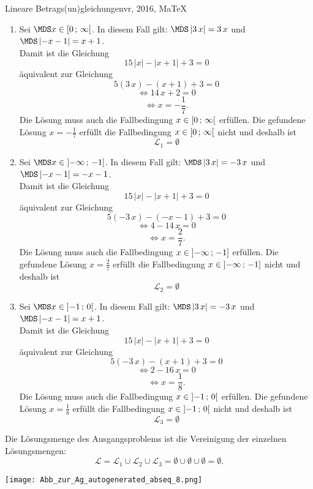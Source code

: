 \begin{MAufgabe}{Lineare Betrags(un)gleichungen}{vr, 2016, MaTeX}
 \begin{enumerate} 
 \item Sei $ \MDS x\in[ 0 \, \MIntvlSep \, \infty\MoIr $. 
 In diesem Fall gilt: 
  $ \MDS \left| 3\, x\right|=3\, x$ und $ \MDS \left|  - x - 1\right|=x + 1$. \\ 
 Damit ist die Gleichung 
 $$ 
15\, \left|x\right| - \left|x + 1\right| + 3= 0
$$
 \"aquivalent zur Gleichung
 $$ 
5\left(3\, x\right)-\left( x + 1\right)+3= 0 
$$  
$$ 
 \Leftrightarrow 14\, x + 2= 0 
$$  
$$ \Leftrightarrow x = - \frac{1}{7} . 
 $$ 
 Die L\"osung muss auch die Fallbedingung $x\in [ 0 \, ; \, \infty[\mbox{}  $ erf\"ullen. Die gefundene L\"osung $x=- \frac{1}{7}$ erf\"ullt die Fallbedingung  $x\in [ 0 \, ; \, \infty[\mbox{} $ nicht und deshalb ist  $$
 \mathcal{L}_{1}=\emptyset 
 $$ 
\item Sei $ \MDS x\in\MoIl  -\infty \, \MIntvlSep \, -1]$. 
 In diesem Fall gilt: 
  $ \MDS \left| 3\, x\right|=- 3\, x$ und $ \MDS \left|  - x - 1\right|= - x - 1$. \\ 
 Damit ist die Gleichung 
 $$ 
15\, \left|x\right| - \left|x + 1\right| + 3= 0
$$
 \"aquivalent zur Gleichung
 $$ 
5\left(- 3\, x\right)-\left(  - x - 1\right)+3= 0 
$$  
$$ 
 \Leftrightarrow 4 - 14\, x= 0 
$$  
$$ \Leftrightarrow x = \frac{2}{7} . 
 $$ 
 Die L\"osung muss auch die Fallbedingung $x\in \mbox{}]\mathopen{}  -\infty \, ; \, -1] $ erf\"ullen. Die gefundene L\"osung $x=\frac{2}{7}$ erf\"ullt die Fallbedingung  $x\in \mbox{}]\mathopen{}  -\infty \, ; \, -1]$ nicht und deshalb ist  $$
 \mathcal{L}_{2}=\emptyset 
 $$ 
\item Sei $ \MDS x\in\MoIl  -1 \, \MIntvlSep \, 0\MoIr $. 
 In diesem Fall gilt: 
  $ \MDS \left| 3\, x\right|=- 3\, x$ und $ \MDS \left|  - x - 1\right|=x + 1$. \\ 
 Damit ist die Gleichung 
 $$ 
15\, \left|x\right| - \left|x + 1\right| + 3= 0
$$
 \"aquivalent zur Gleichung
 $$ 
5\left(- 3\, x\right)-\left( x + 1\right)+3= 0 
$$  
$$ 
 \Leftrightarrow 2 - 16\, x= 0 
$$  
$$ \Leftrightarrow x = \frac{1}{8} . 
 $$ 
 Die L\"osung muss auch die Fallbedingung $x\in \mbox{}]\mathopen{}  -1 \, ; \, 0[\mbox{}  $ erf\"ullen. Die gefundene L\"osung $x=\frac{1}{8}$ erf\"ullt die Fallbedingung  $x\in \mbox{}]\mathopen{}  -1 \, ; \, 0[\mbox{} $ nicht und deshalb ist  $$
 \mathcal{L}_{3}=\emptyset 
 $$ 
 \end{enumerate} 
  Die L\"osungsmenge des Ausgangsproblems ist die Vereinigung der einzelnen L\"osungsmengen: 
$$ \mathcal{L} = \mathcal{L}_{1} \cup \mathcal{L}_{2} \cup \mathcal{L}_{3} 
 = \emptyset\cup \emptyset\cup \emptyset 
   =\emptyset 
   . $$ 
 
 \begin{center}
 \texttt{[image: Abb\_zur\_Ag\_autogenerated\_abseq\_8.png]} \end{center}
 
\else\relax\fi
 \end{MAufgabe}